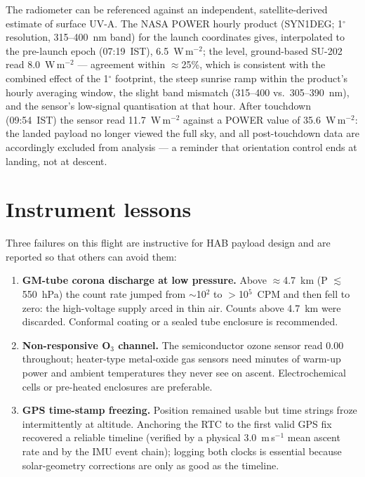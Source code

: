 \documentclass[11pt,a4paper]{article}
\begin{document}
The radiometer can be referenced against an independent, satellite-derived estimate of
surface UV-A. The NASA POWER hourly product (SYN1DEG; 1$^\circ$ resolution, 315--400~nm
band) for the launch coordinates gives, interpolated to the pre-launch epoch
(07:19~IST), 6.5~W\,m$^{-2}$; the level, ground-based SU-202 read 8.0~W\,m$^{-2}$ ---
agreement within $\approx$25\%, which is consistent with the combined effect of the
1$^\circ$ footprint, the steep sunrise ramp within the product's hourly averaging window,
the slight band mismatch (315--400 vs.\ 305--390~nm), and the sensor's low-signal
quantisation at that hour. After touchdown (09:54~IST) the sensor read 11.7~W\,m$^{-2}$
against a POWER value of 35.6~W\,m$^{-2}$: the landed payload no longer viewed the full
sky, and all post-touchdown data are accordingly excluded from analysis --- a reminder
that orientation control ends at landing, not at descent.

\section{Instrument lessons}
\label{sec:lessons}

Three failures on this flight are instructive for HAB payload design and are reported so
that others can avoid them:

\begin{enumerate}
\item \textbf{GM-tube corona discharge at low pressure.} Above $\approx$4.7~km
(P $\lesssim$ 550~hPa) the count rate jumped from $\sim$10$^2$ to $>$10$^5$~CPM and then
fell to zero: the high-voltage supply arced in thin air. Counts above 4.7~km were
discarded. Conformal coating or a sealed tube enclosure is recommended.
\item \textbf{Non-responsive O$_3$ channel.} The semiconductor ozone sensor read 0.00
throughout; heater-type metal-oxide gas sensors need minutes of warm-up power and ambient
temperatures they never see on ascent. Electrochemical cells or pre-heated enclosures are
preferable.
\item \textbf{GPS time-stamp freezing.} Position remained usable but time strings froze
intermittently at altitude. Anchoring the RTC to the first valid GPS fix recovered a
reliable timeline (verified by a physical 3.0~m\,s$^{-1}$ mean ascent rate and by the
IMU event chain); logging both clocks is essential because solar-geometry corrections are
only as good as the timeline.
\end{enumerate}
\end{document}
